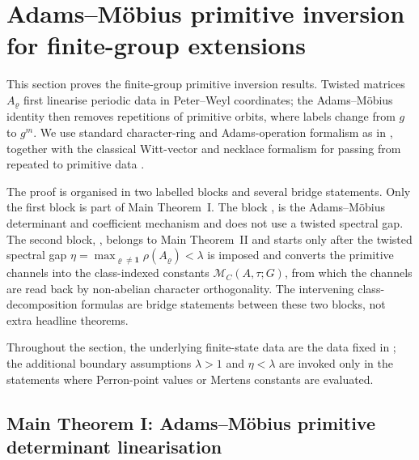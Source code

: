 \section{Adams--M\"obius primitive inversion for finite-group extensions}
\label{sec:chebotarev}

This section proves the finite-group primitive inversion results. Twisted matrices
\(A_\varrho\) first linearise periodic data in Peter--Weyl coordinates;
the Adams--M\"obius identity then removes repetitions of primitive
orbits, where labels change from \(g\) to \(g^m\). We use standard
character-ring and Adams-operation formalism as in
\cite{AtiyahTall1969GroupRepresentationsLambdaRings,Serre1977LinearRepresentations,Knutson1973LambdaRings}, together with
the classical Witt-vector and necklace formalism for passing from
repeated to primitive data
\cite{DressSiebeneicher1988BurnsideRing,MetropolisRota1983Necklaces,Wehrhahn1990AperiodicRings}.

The proof is organised in two labelled blocks and several bridge
statements.  Only the first block is part of Main Theorem~I. The block
,
is the Adams--M\"obius determinant and coefficient
mechanism and does not use a twisted spectral gap. The second block,
, belongs to Main Theorem~II and starts only
after the twisted spectral gap
\(\eta=\max_{\varrho\neq\mathbf 1}\rho(A_\varrho)<\lambda\) is imposed
and converts the primitive channels into the class-indexed constants
\(\mathcal M_C(A,\tau;G)\), from which the channels are read back by
non-abelian character orthogonality. The
intervening class-decomposition formulas are bridge statements between
these two blocks, not extra headline theorems.

Throughout the section, the underlying finite-state data are the data
fixed in ; the additional boundary
assumptions \(\lambda>1\) and \(\eta<\lambda\) are invoked only in the
statements where Perron-point values or Mertens constants are evaluated.

\subsection{Main Theorem I: Adams--M\"obius primitive determinant
linearisation}

